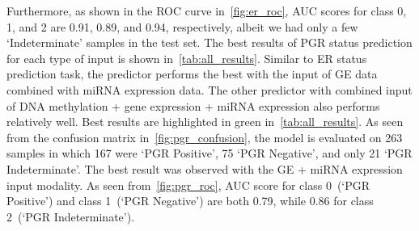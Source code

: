 \hspace*{3.5mm} Furthermore, as shown in the ROC curve in~\cref{fig:er_roc}, AUC scores for class 0, 1, and 2 are 0.91, 0.89, and 0.94, respectively, albeit we had only a few `Indeterminate' samples in the test set. The best results of PGR status prediction for each type of input is shown in~\cref{tab:all_results}. Similar to ER status prediction task, the predictor performs the best with the input of GE data combined with miRNA expression data. The other predictor with combined input of DNA methylation + gene expression + miRNA expression also performs relatively well. Best results are highlighted in green in~\cref{tab:all_results}. As seen from the confusion matrix in~\cref{fig:pgr_confusion}, the model is evaluated on 263 samples in which 167 were `PGR Positive', 75 `PGR Negative', and only 21 `PGR Indeterminate'. The best result was observed with the GE + miRNA expression input modality. As seen from~\cref{fig:pgr_roc}, AUC score for class 0~(`PGR Positive') and class 1~(`PGR Negative') are both 0.79, while 0.86 for class 2~(`PGR Indeterminate').

